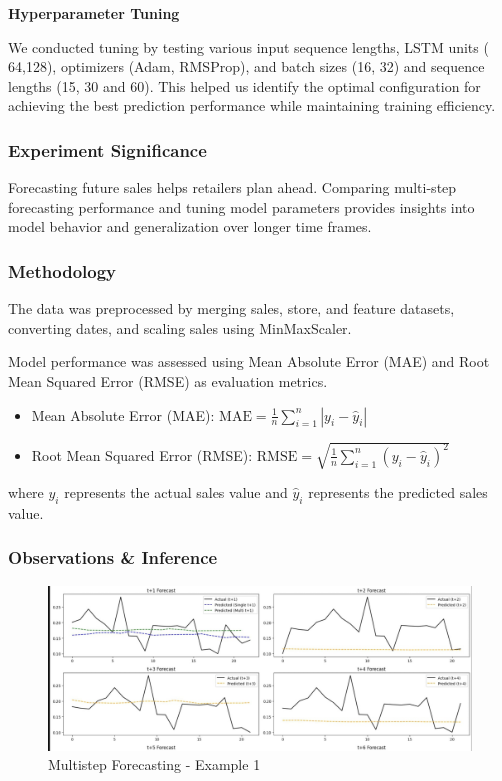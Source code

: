 \documentclass[conference]{IEEEtran}
\begin{document}
\textbf{Hyperparameter Tuning}\par
We conducted tuning by testing various input sequence lengths, LSTM units ( 64,128), optimizers (Adam, RMSProp), and batch sizes (16, 32) and sequence lengths (15, 30 and 60). This helped us identify the optimal configuration for achieving the best prediction performance while maintaining training efficiency.

\subsubsection{Experiment Significance}
Forecasting future sales helps retailers plan ahead. Comparing multi-step forecasting performance and tuning model parameters provides insights into model behavior and generalization over longer time frames.

\subsubsection{Methodology}
The data was preprocessed by merging sales, store, and feature datasets, converting dates, and scaling sales using MinMaxScaler.





Model performance was assessed using Mean Absolute Error (MAE) and Root Mean Squared Error (RMSE) as evaluation metrics.
\begin{itemize}
  \item Mean Absolute Error (MAE): $\text{MAE} = \frac{1}{n}\sum_{i=1}^{n}|y_i - \hat{y}_i|$
  \item Root Mean Squared Error (RMSE): $\text{RMSE} = \sqrt{\frac{1}{n}\sum_{i=1}^{n}(y_i - \hat{y}_i)^2}$
\end{itemize}
where $y_i$ represents the actual sales value and $\hat{y}_i$ represents the predicted sales value.


\subsubsection{Observations \& Inference}

\begin{figure}[H]
    \centering
    \includegraphics[width=0.95\linewidth]{Multistep_forecasting.jpg}
    \caption{Multistep Forecasting - Example 1}
    \label{fig:multistep1}
\end{figure}
\end{document}
